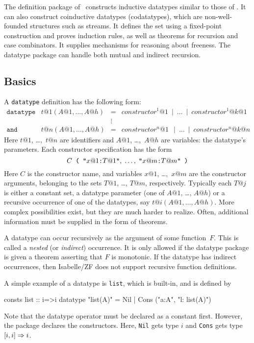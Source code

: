 The  definition package of \ZF\ constructs inductive
datatypes similar to those of \ML.  It can also construct coinductive
datatypes (codatatypes), which are non-well-founded structures such as
streams.  It defines the set using a fixed-point construction and proves
induction rules, as well as theorems for recursion and case combinators.  It
supplies mechanisms for reasoning about freeness.  The datatype package can
handle both mutual and indirect recursion.


\subsection{Basics}
\label{subsec:datatype:basics}

A \texttt{datatype} definition has the following form:
\[
\begin{array}{llcl}
\mathtt{datatype} & t@1(A@1,\ldots,A@h) & = &
  constructor^1@1 ~\mid~ \ldots ~\mid~ constructor^1@{k@1} \\
 & & \vdots \\
\mathtt{and} & t@n(A@1,\ldots,A@h) & = &
  constructor^n@1~ ~\mid~ \ldots ~\mid~ constructor^n@{k@n}
\end{array}
\]
Here $t@1$, \ldots,~$t@n$ are identifiers and $A@1$, \ldots,~$A@h$ are
variables: the datatype's parameters.  Each constructor specification has the
form \dquotesoff
\[ C \hbox{\tt~( } \hbox{\tt"} x@1 \hbox{\tt:} T@1 \hbox{\tt"},\;
                   \ldots,\;
                   \hbox{\tt"} x@m \hbox{\tt:} T@m \hbox{\tt"}
     \hbox{\tt~)}
\]
Here $C$ is the constructor name, and variables $x@1$, \ldots,~$x@m$ are the
constructor arguments, belonging to the sets $T@1$, \ldots, $T@m$,
respectively.  Typically each $T@j$ is either a constant set, a datatype
parameter (one of $A@1$, \ldots, $A@h$) or a recursive occurrence of one of
the datatypes, say $t@i(A@1,\ldots,A@h)$.  More complex possibilities exist,
but they are much harder to realize.  Often, additional information must be
supplied in the form of theorems.

A datatype can occur recursively as the argument of some function~$F$.  This
is called a {\em nested} (or \emph{indirect}) occurrence.  It is only allowed
if the datatype package is given a theorem asserting that $F$ is monotonic.
If the datatype has indirect occurrences, then Isabelle/ZF does not support
recursive function definitions.

A simple example of a datatype is \texttt{list}, which is built-in, and is
defined by
\begin{ttbox}
consts     list :: i=>i
datatype  "list(A)" = Nil | Cons ("a:A", "l: list(A)")
\end{ttbox}
Note that the datatype operator must be declared as a constant first.
However, the package declares the constructors.  Here, \texttt{Nil} gets type
$i$ and \texttt{Cons} gets type $[i,i]\Rightarrow i$.

